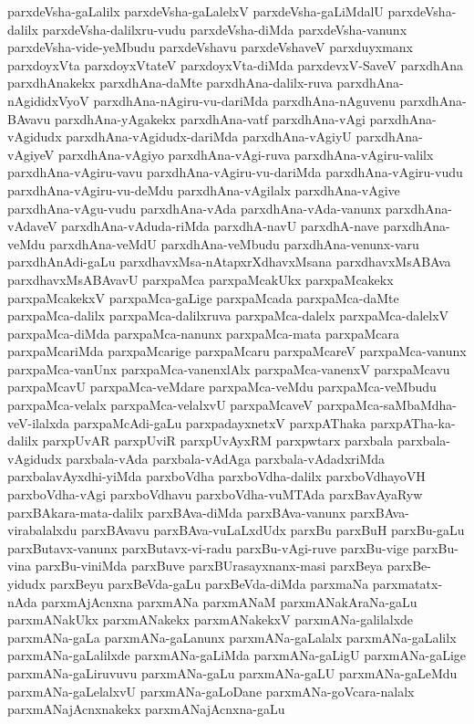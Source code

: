 {parxdeVsha-gaLalilx
parxdeVsha-gaLalelxV
parxdeVsha-gaLiMdalU
parxdeVsha-dalilx
parxdeVsha-dalilxru-vudu
parxdeVsha-diMda
parxdeVsha-vanunx
parxdeVsha-vide-yeMbudu
parxdeVshavu
parxdeVshaveV
parxduyxmanx
parxdoyxVta
parxdoyxVtateV
parxdoyxVta-diMda
parxdevxV-SaveV
parxdhAna
parxdhAnakekx
parxdhAna-daMte
parxdhAna-dalilx-ruva
parxdhAna-nAgididxVyoV
parxdhAna-nAgiru-vu-dariMda
parxdhAna-nAguvenu
parxdhAna-BAvavu
parxdhAna-yAgakekx
parxdhAna-vatf
parxdhAna-vAgi
parxdhAna-vAgidudx
parxdhAna-vAgidudx-dariMda
parxdhAna-vAgiyU
parxdhAna-vAgiyeV
parxdhAna-vAgiyo
parxdhAna-vAgi-ruva
parxdhAna-vAgiru-valilx
parxdhAna-vAgiru-vavu
parxdhAna-vAgiru-vu-dariMda
parxdhAna-vAgiru-vudu
parxdhAna-vAgiru-vu-deMdu
parxdhAna-vAgilalx
parxdhAna-vAgive
parxdhAna-vAgu-vudu
parxdhAna-vAda
parxdhAna-vAda-vanunx
parxdhAna-vAdaveV
parxdhAna-vAduda-riMda
parxdhA-navU
parxdhA-nave
parxdhAna-veMdu
parxdhAna-veMdU
parxdhAna-veMbudu
parxdhAna-venunx-varu
parxdhAnAdi-gaLu
parxdhavxMsa-nAtapxrXdhavxMsana
parxdhavxMsABAva
parxdhavxMsABAvavU
parxpaMca
parxpaMcakUkx
parxpaMcakekx
parxpaMcakekxV
parxpaMca-gaLige
parxpaMcada
parxpaMca-daMte
parxpaMca-dalilx
parxpaMca-dalilxruva
parxpaMca-dalelx
parxpaMca-dalelxV
parxpaMca-diMda
parxpaMca-nanunx
parxpaMca-mata
parxpaMcara
parxpaMcariMda
parxpaMcarige
parxpaMcaru
parxpaMcareV
parxpaMca-vanunx
parxpaMca-vanUnx
parxpaMca-vanenxlAlx
parxpaMca-vanenxV
parxpaMcavu
parxpaMcavU
parxpaMca-veMdare
parxpaMca-veMdu
parxpaMca-veMbudu
parxpaMca-velalx
parxpaMca-velalxvU
parxpaMcaveV
parxpaMca-saMbaMdha-veV-ilalxda
parxpaMcAdi-gaLu
parxpadayxnetxV
parxpAThaka
parxpATha-ka-dalilx
parxpUvAR
parxpUviR
parxpUvAyxRM
parxpwtarx
parxbala
parxbala-vAgidudx
parxbala-vAda
parxbala-vAdAga
parxbala-vAdadxriMda
parxbalavAyxdhi-yiMda
parxboVdha
parxboVdha-dalilx
parxboVdhayoVH
parxboVdha-vAgi
parxboVdhavu
parxboVdha-vuMTAda
parxBavAyaRyw
parxBAkara-mata-dalilx
parxBAva-diMda
parxBAva-vanunx
parxBAva-virabalalxdu
parxBAvavu
parxBAva-vuLaLxdUdx
parxBu
parxBuH
parxBu-gaLu
parxButavx-vanunx
parxButavx-vi-radu
parxBu-vAgi-ruve
parxBu-vige
parxBu-vina
parxBu-viniMda
parxBuve
parxBUrasayxnanx-masi
parxBeya
parxBe-yidudx
parxBeyu
parxBeVda-gaLu
parxBeVda-diMda
parxmaNa
parxmatatx-nAda
parxmAjAcnxna
parxmANa
parxmANaM
parxmANakAraNa-gaLu
parxmANakUkx
parxmANakekx
parxmANakekxV
parxmANa-galilalxde
parxmANa-gaLa
parxmANa-gaLanunx
parxmANa-gaLalalx
parxmANa-gaLalilx
parxmANa-gaLalilxde
parxmANa-gaLiMda
parxmANa-gaLigU
parxmANa-gaLige
parxmANa-gaLiruvuvu
parxmANa-gaLu
parxmANa-gaLU
parxmANa-gaLeMdu
parxmANa-gaLelalxvU
parxmANa-gaLoDane
parxmANa-goVcara-nalalx
parxmANajAcnxnakekx
parxmANajAcnxna-gaLu
}
